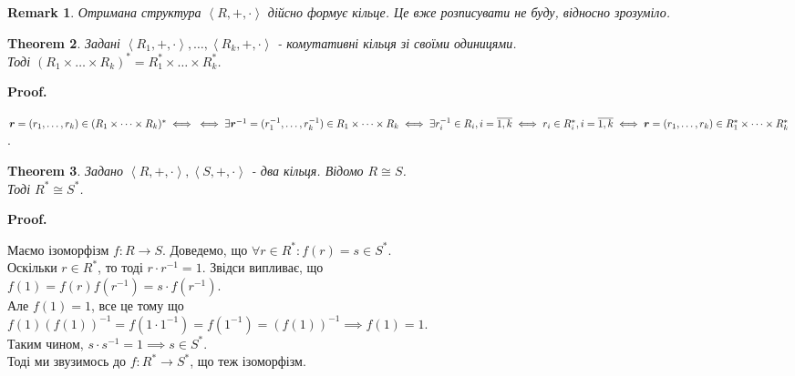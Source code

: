 \documentclass[a4paper, 10pt]{article}
\makeatletter
\theoremstyle{theoremdd}
\newtheorem{theorem}{Theorem}[subsection]
\theoremstyle{theoremdd}
\theoremstyle{theoremdd}
\theoremstyle{theoremdd}
\theoremstyle{theoremdd}
\theoremstyle{theoremdd}
\newtheorem{remark}[theorem]{Remark}
\theoremstyle{theoremdd}
\theoremstyle{theoremdd}
\renewenvironment{proof}[1][Proof.\\]{\par
\pushQED{\hfill \qed}%
\normalfont \topsep6\p@\@plus6\p@\relax
\trivlist
\item\relax
{\bfseries
#1\@addpunct{.}}\hspace\labelsep\ignorespaces
}{%
\popQED\endtrivlist\@endpefalse
}
\makeatother
\begin{document}
\begin{remark}
Отримана структура $\left<R,+,\cdot \right>$ дійсно формує кільце. Це вже розписувати не буду, відносно зрозуміло.
\end{remark}

\begin{theorem}
Задані $\left<R_1,+,\cdot \right>, \dots, \left<R_k,+,\cdot \right>$ - комутативні кільця зі своїми одиницями.\\
Тоді $(R_1 \times \dots \times R_k)^* = R_1^* \times \dots \times R_k^*$.
\end{theorem}

\begin{proof}
$\boldsymbol{r} = (r_1,\dots,r_k) \in (R_1 \times \dots \times R_k)^* \iff \\ \iff \exists \boldsymbol{r}^{-1} = (r_1^{-1},\dots,r_k^{-1}) \in R_1 \times \dots \times R_k \iff \exists r_i^{-1} \in R_i, i = \overline{1,k} \iff r_i \in R_i^*, i = \overline{1,k} \iff \boldsymbol{r} = (r_1,\dots,r_k) \in R_1^* \times \dots \times R_k^*$.
\end{proof}

\begin{theorem}
Задано $\left<R,+,\cdot \right>, \left<S,+,\cdot \right>$ - два кільця. Відомо $R \cong S$.\\
Тоді $R^* \cong S^*$.
\end{theorem}

\begin{proof}
Маємо ізоморфізм $f: R \to S$. Доведемо, що $\forall r \in R^*: f(r) = s \in S^*$.\\
Оскільки $r \in R^*$, то тоді $r \cdot r^{-1} = 1$. Звідси випливає, що\\
$f(1) = f(r) f(r^{-1}) = s \cdot f(r^{-1})$.\\
Але $f(1) = 1$, все це тому що \\$f(1)(f(1))^{-1} = f(1 \cdot 1^{-1}) = f(1^{-1}) = (f(1))^{-1} \implies f(1) = 1$.\\
Таким чином, $s \cdot s^{-1} = 1 \implies s \in S^*$.\\
Тоді ми звузимось до $f: R^* \to S^*$, що теж ізоморфізм.
\end{proof}

\iffalse
А ось цей наслідок дозволяє дуже просто довести властивість мультиплікативності функції Ойлера, зокрема в силу ізоморфності, ми отримаємо:\\
$\# U_N = \# U_{n_1} \dots \# U_{n_k}$\\
$\varphi(N) = \varphi(n_1) \dots \varphi(n_k)$.
\fi
\end{document}
